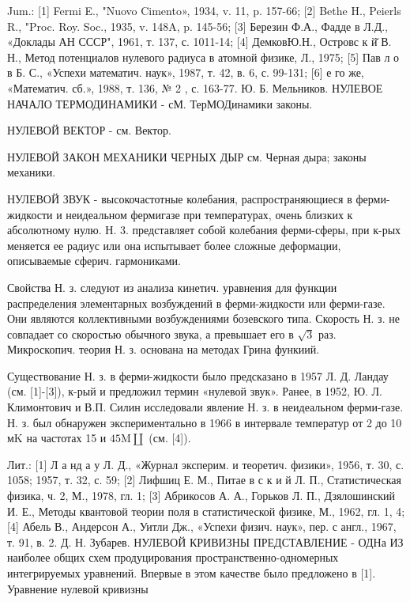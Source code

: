 \documentclass[10pt]{article}
\begin{document}
Jum.: [1] Fermi E., "Nuovo Cimento», 1934, v. 11, p. 157-66; [2] Bethe H., Peierls R., "Proc. Roy. Soc., 1935, v. 148A, p. 145-56; [3] Березин Ф.А., Фадде в Л.Д., «Доклады АН СССР", 1961, т. 137, с. 1011-14; [4] ДемковЮ.Н., Островс к й̆ В. Н., Метод потенциалов нулевого радиуса в атомной физике, Л., 1975; [5] Пав л о в Б. С., «Успехи математич. наук», 1987, т. 42, в. 6, с. 99-131; [6] е го же, «Математич. сб.», 1988, т. 136, № 2 , с. 163-77. Ю. Б. Мельников. НУЛЕВОЕ НАЧАЛО ТЕРМОДИНАМИКИ - сМ. ТерМОДинамики законы.



НУЛЕВОЙ ВЕКТОР - см. Вектор.



НУЛЕВОЙ ЗАКОН МЕХАНИКИ ЧЕРНЫХ ДЫР см. Черная дыра; законы механики.



НУЛЕВОЙ ЗВУК - высокочастотные колебания, распространяющиеся в ферми-жидкости и неидеальном фермигазе при температурах, очень близких к абсолютному нулю. Н. 3. представляет собой колебания ферми-сферы, при к-рых меняется ее радиус или она испытывает более сложные деформации, описываемые сферич. гармониками.



Свойства Н. з. следуют из анализа кинетич. уравнения для функции распределения элементарных возбуждений в ферми-жидкости или ферми-газе. Они являются коллективными возбуждениями бозевского типа. Скорость Н. з. не совпадает со скоростью обычного звука, а превышает его в $\sqrt{3}$ раз. Микроскопич. теория Н. з. основана на методах Грина функиий.



Существование Н. з. в ферми-жидкости было предсказано в 1957 Л. Д. Ландау (см. [1]-[3]), к-рый и предложил термин «нулевой звук». Ранее, в 1952, Ю. Л. Климонтович и В.П. Силин исследовали явление Н. з. в неидеальном ферми-газе. Н. з. был обнаружен экспериментально в 1966 в интервале температур от 2 до 10 мK на частотах 15 и $45 \mathrm{M} \amalg$ (см. [4]).



Лит.: [1] Л а нд а у Л. Д., «Журнал эксперим. и теоретич. физики», 1956, т. 30, с. 1058; 1957, т. 32, с. 59; [2] Лифшиц Е. М., Питае в с к и й Л. П., Статистическая физика, ч. 2, М., 1978, гл. 1; [3] Абрикосов А. А., Горьков Л. П., Дзялошинский И. Е., Методы квантовой теории поля в статистической физике, М., 1962, гл. 1, 4; [4] Абель В., Андерсон А., Уитли Дж., «Успехи физич. наук», пер. с англ., 1967, т. 91, в. 2. Д. Н. Зубарев. НУЛЕВОЙ КРИВИЗНЫ ПРЕДСТАВЛЕНИЕ - ОДНа ИЗ наиболее общих схем продуцирования пространственно-одномерных интегрируемых уравнений. Впервые в этом качестве было предложено в [1]. Уравнение нулевой кривизны
\end{document}
